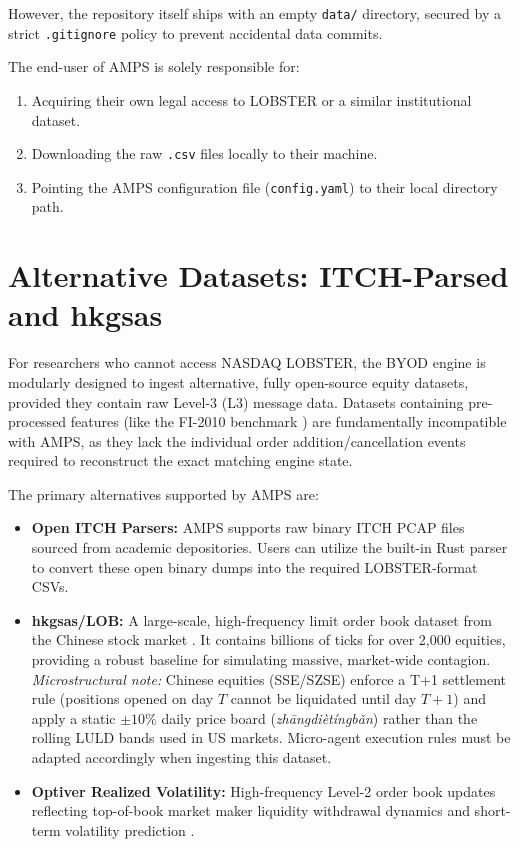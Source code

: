 However, the repository itself ships with an empty \texttt{data/} directory, secured by a strict \texttt{.gitignore} policy to prevent accidental data commits. 

The end-user of AMPS is solely responsible for:
\begin{enumerate}
    \item Acquiring their own legal access to LOBSTER or a similar institutional dataset.
    \item Downloading the raw \texttt{.csv} files locally to their machine.
    \item Pointing the AMPS configuration file (\texttt{config.yaml}) to their local directory path.
\end{enumerate}

\section{Alternative Datasets: ITCH-Parsed and hkgsas}

For researchers who cannot access NASDAQ LOBSTER, the BYOD engine is modularly designed to ingest alternative, fully open-source equity datasets, provided they contain raw Level-3 (L3) message data. Datasets containing pre-processed features (like the FI-2010 benchmark \cite{ntakaris2018fi2010}) are fundamentally incompatible with AMPS, as they lack the individual order addition/cancellation events required to reconstruct the exact matching engine state.

The primary alternatives supported by AMPS are:
\begin{itemize}
    \item \textbf{Open ITCH Parsers:} AMPS supports raw binary ITCH PCAP files sourced from academic depositories. Users can utilize the built-in Rust parser to convert these open binary dumps into the required LOBSTER-format CSVs.
    \item \textbf{hkgsas/LOB:} A large-scale, high-frequency limit order book dataset from the Chinese stock market \cite{hkgsas2020benchmark}. It contains billions of ticks for over 2,000 equities, providing a robust baseline for simulating massive, market-wide contagion. \textit{Microstructural note:} Chinese equities (SSE/SZSE) enforce a T+1 settlement rule (positions opened on day $T$ cannot be liquidated until day $T+1$) and apply a static $\pm10\%$ daily price board (\textit{zh\={a}ngdi\`{e}t\'{i}ngb\v{a}n}) rather than the rolling LULD bands \cite{sec2012luld} used in US markets. Micro-agent execution rules must be adapted accordingly when ingesting this dataset.
    \item \textbf{Optiver Realized Volatility:} High-frequency Level-2 order book updates reflecting top-of-book market maker liquidity withdrawal dynamics and short-term volatility prediction \cite{optiver2021realized}.
\end{itemize}

